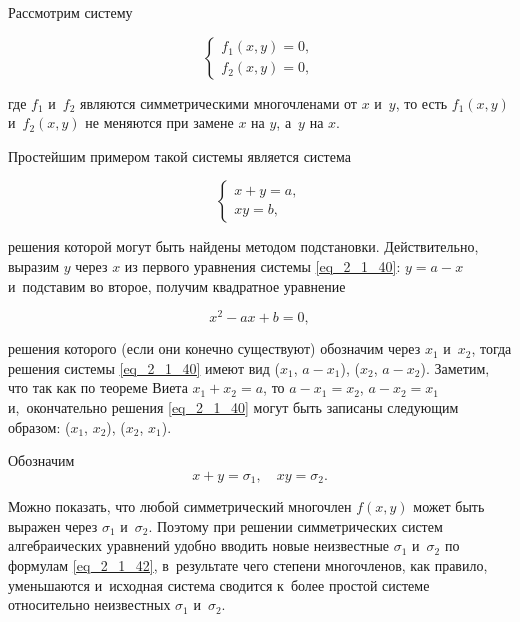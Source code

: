 
Рассмотрим систему

\begin{equation}\label{eq_2_1_39}
\begin{cases}
f_{1}(x, y) = 0, \\
f_{2}(x, y) = 0,
\end{cases}
\end{equation}

\noindent
где $f_{1}$ и~$f_{2}$ являются симметрическими многочленами от $x$ и~$y$,
то есть $f_{1}(x, y)$ и~$f_{2}(x, y)$ не меняются при замене $x$ на $y$,
а~$y$ на $x$.

Простейшим примером такой системы является система 

\begin{equation}\label{eq_2_1_40}
\begin{cases}
x + y = a, \\
xy = b,
\end{cases}
\end{equation}

\noindent
решения которой могут быть найдены методом подстановки.
Действительно, выразим $y$ через $x$ из первого уравнения системы \eqref{eq_2_1_40}:
$y = a - x$ и~подставим во второе, получим квадратное уравнение

\begin{equation}\label{eq_2_1_41}
x^{2} - ax + b = 0,
\end{equation}

\noindent
решения которого (если они конечно существуют) обозначим через $x_{1}$ и~$x_{2}$,
тогда решения системы \eqref{eq_2_1_40} имеют вид
($x_{1}$, $a - x_{1}$), ($x_{2}$, $a - x_{2}$).
Заметим, что так как по теореме Виета $x_{1} + x_{2} = a$, то $a - x_{1} = x_{2}$,
$a - x_{2} = x_{1}$ и,~окончательно решения \eqref{eq_2_1_40} могут быть записаны
следующим образом: ($x_{1}$, $x_{2}$), ($x_{2}$, $x_{1}$).

Обозначим
\begin{equation}\label{eq_2_1_42}
x + y = \sigma_{1}, \quad xy = \sigma_{2}. 
\end{equation}

Можно показать, что любой симметрический многочлен $f(x, y)$ может быть выражен
через $\sigma_{1}$ и~$\sigma_{2}$. Поэтому при решении симметрических систем
алгебраических уравнений удобно вводить новые неизвестные $\sigma_{1}$ и~$\sigma_{2}$
по формулам \eqref{eq_2_1_42}, в~результате чего степени многочленов, как правило,
уменьшаются и~исходная система сводится к~более простой системе относительно неизвестных
$\sigma_{1}$ и~$\sigma_{2}$. 

